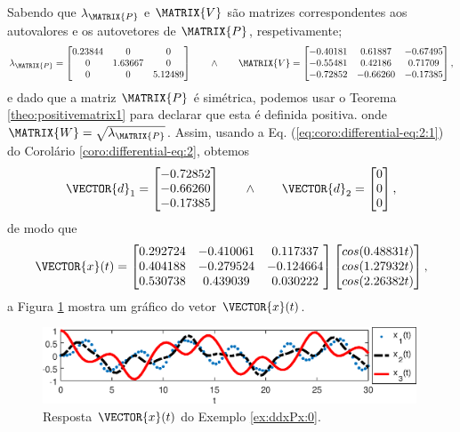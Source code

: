 \newpage
\begin{SolutionT}
\label{ex:ddxPx:0:sol1}
Sabendo que $\lambda_{\MATRIX{P}}$ e $\MATRIX{V}$ são matrizes correspondentes aos autovalores e os autovetores de $\MATRIX{P}$,
respetivamente; 
\begin{equation}
\lambda_{\MATRIX{P}}=
\begin{bmatrix}
   0.23844 &       0 &       0\\
         0 & 1.63667 &       0\\
         0 &       0 & 5.12489
\end{bmatrix}
\qquad \wedge \qquad
\MATRIX{V}=
\begin{bmatrix}
  -0.40181 & 0.61887 &-0.67495\\
  -0.55481 & 0.42186 & 0.71709\\
  -0.72852 &-0.66260 &-0.17385
\end{bmatrix},
\end{equation}
e dado que a matriz $\MATRIX{P}$ é simétrica, podemos usar o Teorema \ref{theo:positivematrix1}
para declarar que esta é definida positiva. 
onde $\MATRIX{W}=\sqrt{\lambda_{\MATRIX{P}}}$.
Assim, usando a Eq. (\ref{eq:coro:differential-eq:2:1}) do Corolário \ref{coro:differential-eq:2},
obtemos
\begin{equation}
\VECTOR{d}_1=
\begin{bmatrix}
  -0.72852\\
  -0.66260\\
  -0.17385
\end{bmatrix}
\qquad \wedge \qquad
\VECTOR{d}_2=
\begin{bmatrix}
   0\\
   0\\
   0
\end{bmatrix},
\end{equation}
de modo que 
\begin{equation}
 \VECTOR{x}(t)= 
\begin{bmatrix}
   0.292724 &-0.410061 & 0.117337\\
   0.404188 &-0.279524 &-0.124664\\
   0.530738 & 0.439039 & 0.030222
\end{bmatrix}
\begin{bmatrix}
   cos(0.48831 t)\\
   cos(1.27932 t)\\
   cos(2.26382 t)
\end{bmatrix},
\end{equation}
a Figura \ref{fig:ex:ddxPx:0} mostra um gráfico do vetor $\VECTOR{x}(t)$.
\end{SolutionT}
     \begin{figure}[!h]
         \centering
         \includegraphics[width=0.99\textwidth]{chapters/differential-eq/mfiles/segundoorder/segundoroder1.eps}
         \caption{Resposta $\VECTOR{x}(t)$ do Exemplo \ref{ex:ddxPx:0}.}
         \label{fig:ex:ddxPx:0}
     \end{figure}

